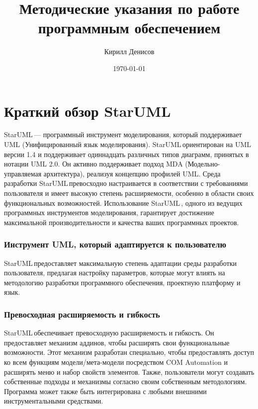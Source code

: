 \documentclass[a4paper,12pt]{report}
\author{Кирилл Денисов}
\title{Методические указания по работе программным обеспечением \staruml}
\date{\today}
\newcommand{\pathToCommonFolder}{../../Common}
\newcommand{\staruml}{StarUML\,\tm}
\begin{document}
\maketitle
\newpage

	
	
	\newpage
	\tableofcontents
	\newpage
	
	
\chapter{Краткий обзор \staruml}

\staruml --- программный инструмент моделирования, который поддерживает UML
(Унифицированный язык моделирования). \staruml ориентирован на UML версии 1.4 и
поддерживает одиннадцать различных типов диаграмм, принятых в нотации UML 2.0. Он активно
поддерживает подход MDA (Модельно-управляемая архитектура), реализуя концепцию профилей
UML. Среда разработки \staruml превосходно настраивается в соответствии с требованиями
пользователя и имеет высокую степень расширяемости, особенно в области своих
функциональных возможностей. Использование \staruml, одного из ведущих программных
инструментов моделирования, гарантирует достижение максимальной производительности и
качества ваших программных проектов.
\subsection*{Инструмент UML, который адаптируется к пользователю}
\staruml  предоставляет максимальную степень адаптации среды разработки пользователя,
предлагая настройку параметров, которые могут влиять на методологию разработки программного
обеспечения, проектную платформу и язык.

\subsection*{Превосходная расширяемость и гибкость}
\staruml  обеспечивает превосходную расширяемость и гибкость. Он предоставляет механизм
аддинов, чтобы расширять свои функциональные возможности. Этот механизм разработан
специально, чтобы предоставлять доступ ко всем функциям модели/мета-модели посредством
COM Automation и расширять меню и набор свойств элементов. Также, пользователи могут
создавать собственные подходы и механизмы согласно своим собственным методологиям.
Программа может также быть интегрирована с любыми внешними инструментальными
средствами.
\end{document}
